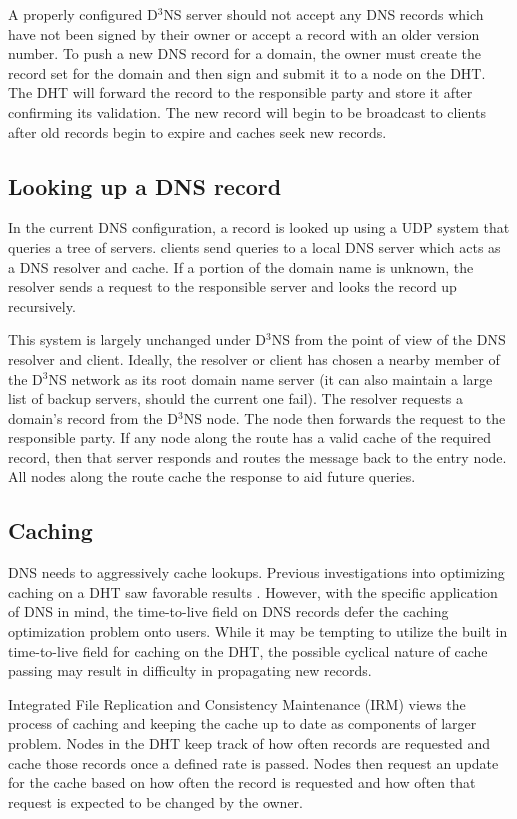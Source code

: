 \documentclass[11pt]{IEEEtran} %
\begin{document}
A properly configured D$^3$NS server should not accept any DNS records which have not been signed by their owner or accept a record with an older version number. To push a new DNS record for a domain, the owner must create the record set for the domain and then sign and submit it to a node on the DHT. The DHT will forward the record to the responsible party and store it after confirming its validation. The new record will begin to be broadcast to clients after old records begin to expire and caches seek new records.

\subsection{Looking up a DNS record}
In the current DNS configuration, a record is looked up using a UDP system that queries a tree of servers. clients send queries to  a local DNS server which acts as a DNS resolver and cache. If a portion of the domain name is unknown, the resolver sends a request to the responsible server and looks the record up recursively.

This system is largely unchanged under D$^{3}$NS from the point of view of the DNS resolver and client. Ideally, the resolver or client has chosen a nearby member of the D$^{3}$NS network as its root domain name server (it can also maintain a large list of backup servers, should the current one fail). The resolver requests a domain's record from the D$^{3}$NS node. The node then forwards the request to the responsible party. If any node along the route has a valid cache of the required record, then that server responds and routes the message back to the entry node. All nodes along the route cache the response to aid future queries.

\subsection{Caching}
DNS needs to aggressively cache lookups. Previous investigations into optimizing caching on a DHT saw favorable results \cite{irm}. However, with the specific application of DNS in mind, the time-to-live field on DNS records defer the caching optimization problem onto users. 
While it may be tempting to utilize the built in time-to-live field for caching on the DHT, the possible cyclical nature of cache passing may result in difficulty in propagating new records.

 
Integrated File Replication and Consistency Maintenance (IRM) \cite{irm} views the process of caching and keeping the cache up to date as components of larger problem.  Nodes in the DHT keep track of how often records are requested and cache those records once a defined rate is passed.  Nodes then request an update for the cache based on how often the record is requested and how often that request is expected to be changed by the owner.
\end{document}
